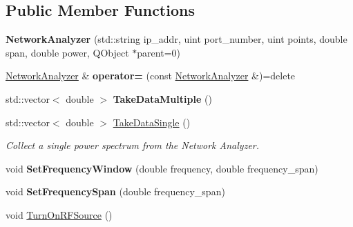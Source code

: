 \subsection*{Public Member Functions}
\begin{DoxyCompactItemize}
\item 
{\bfseries Network\+Analyzer} (std\+::string ip\+\_\+addr, uint port\+\_\+number, uint points, double span, double power, Q\+Object $\ast$parent=0)\hypertarget{class_network_analyzer_a99a9eb7f1bfd2819e695a342e2b9be98}{}\label{class_network_analyzer_a99a9eb7f1bfd2819e695a342e2b9be98}

\item 
\hyperlink{class_network_analyzer}{Network\+Analyzer} \& {\bfseries operator=} (const \hyperlink{class_network_analyzer}{Network\+Analyzer} \&)=delete\hypertarget{class_network_analyzer_a2785c012d28fb621e7218a9e471716e3}{}\label{class_network_analyzer_a2785c012d28fb621e7218a9e471716e3}

\item 
std\+::vector$<$ double $>$ {\bfseries Take\+Data\+Multiple} ()\hypertarget{class_network_analyzer_a667cf86a80639bb57c67061b7c9df210}{}\label{class_network_analyzer_a667cf86a80639bb57c67061b7c9df210}

\item 
std\+::vector$<$ double $>$ \hyperlink{class_network_analyzer_aa7ae9c649f4d7a5828e2d24ad8dee65d}{Take\+Data\+Single} ()
\begin{DoxyCompactList}\small\item\em Collect a single power spectrum from the Network Analyzer. \end{DoxyCompactList}\item 
void {\bfseries Set\+Frequency\+Window} (double frequency, double frequency\+\_\+span)\hypertarget{class_network_analyzer_a65864fe6142eadfd8e3e976e592e4bf0}{}\label{class_network_analyzer_a65864fe6142eadfd8e3e976e592e4bf0}

\item 
void {\bfseries Set\+Frequency\+Span} (double frequency\+\_\+span)\hypertarget{class_network_analyzer_a5d986f4eb0ed10030ba02ef43b65ac30}{}\label{class_network_analyzer_a5d986f4eb0ed10030ba02ef43b65ac30}

\item 
void \hyperlink{class_network_analyzer_a6d4e76a043fd30788167c4c0e187ed00}{Turn\+On\+R\+F\+Source} ()\hypertarget{class_network_analyzer_a6d4e76a043fd30788167c4c0e187ed00}{}\label{class_network_analyzer_a6d4e76a043fd30788167c4c0e187ed00}


\end{DoxyCompactItemize}
